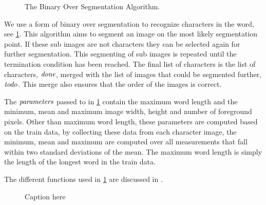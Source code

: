 \newcommand{\body}{\ensuremath{\t{body}}\xspace}
\newcommand{\strokewidth}{\ensuremath{\t{stroke\_w}}\xspace}
\newcommand{\segmentationpoints}{\ensuremath{\t{sps}}\xspace}
\newcommand{\segmentationpoint}{\ensuremath{\t{sp}}\xspace}
\newcommand{\image}{\ensuremath{\t{image}}\xspace}
\newcommand{\subimage}{\ensuremath{\t{sub\_image}}\xspace}
\newcommand{\leftsubimage}{\ensuremath{\t{left}}\xspace}
\newcommand{\rightsubimage}{\ensuremath{\t{right}}\xspace}
\newcommand{\segmentfurther}{\ensuremath{\t{todo}}\xspace}
\newcommand{\characters}{\ensuremath{\t{done}}\xspace}
\newcommand{\parameters}{\ensuremath{\t{parameters}}\xspace}

\begin{figure}
	
	\caption{The Binary Over Segmentation Algorithm.}
	\label{alg:method:segmentation:algorithm}
\end{figure}

We use a form of binary over segmentation to recognize characters in the word, see \cref{alg:method:segmentation:algorithm}. This algorithm aims to segment an image on the most likely segmentation point. If these sub images are not characters they can be selected again for further segmentation. This segmenting of sub images is repeated until the termination condition has been reached. The final list of characters is the list of characters, \characters, merged with the list of images that could be segmented further, \segmentfurther. This merge also ensures that the order of the images is correct.

The \parameters passed to  in \cref{alg:method:segmentation:algorithm} contain the maximum word length and the minimum, mean and maximum image width, height and number of foreground pixels. Other than maximum word length, these parameters are computed based on the train data, by collecting these data from each character image, the minimum, mean and maximum are computed over all measurements that fall within two standard deviations of the mean. The maximum word length is simply the length of the longest word in the train data.

The different functions used in \cref{alg:method:segmentation:algorithm} are discussed in .

\begin{figure}
	\centering
	\caption{Caption here}
	\label{fig:method:segmentation:tree}
\end{figure}

